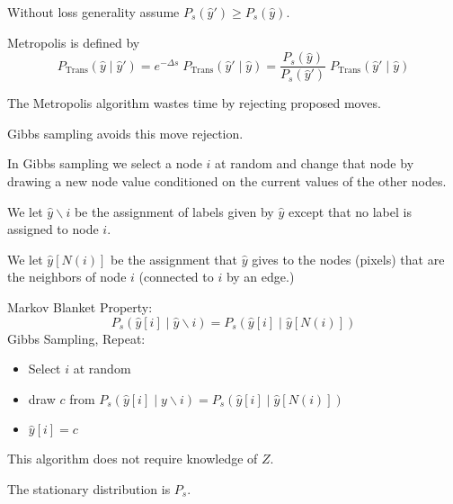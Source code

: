 {\vfill
Without loss generality assume $P_s(\hat{y}') \geq P_s(\hat{y})$.

\vfill
Metropolis is defined by
$$P_{\mathrm{Trans}}(\hat{y}\;|\;\hat{y}') = e^{-\Delta s}\;P_{\mathrm{Trans}}(\hat{y}'\;|\;\hat{y}) = \frac{P_s(\hat{y})}{P_s(\hat{y}')}\;P_{\mathrm{Trans}}(\hat{y}'\;|\;\hat{y})$$


The Metropolis algorithm wastes time by rejecting proposed moves.

\vfill
Gibbs sampling avoids this move rejection.

\vfill
In Gibbs sampling we select a node $i$ at random and change that node by drawing a new node value conditioned on the current values of the other nodes.

\vfill
We let {\color{red} $\hat{y} \backslash i$} be the assignment of labels given by $\hat{y}$ except that no label is assigned to node $i$.

\vfill
We let {\color{red} $\hat{y}[N(i)]$} be the assignment that $\hat{y}$ gives to the nodes (pixels) that are the neighbors of node $i$ (connected to $i$ by an edge.)


Markov Blanket Property:
{\color{red} $$P_s(\hat{y}[i] \;|\;\hat{y} \backslash i) = P_s(\hat{y}[i] \;|\; \hat{y}[N(i)])$$}
\vfill
Gibbs Sampling, Repeat:

\begin{itemize}
\item   Select $i$ at random

\item {\color{red} draw $c$ from $P_s(\hat{y}[i]\;|\;y\backslash i) = P_s(\hat{y}[i] \;|\;\hat{y}[N(i)])$}

\item $\hat{y}[i] = c$
\end{itemize}

\vfill
This algorithm does not require knowledge of $Z$.

\vfill
The stationary distribution is $P_s$.


}


